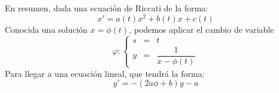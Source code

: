 En resumen, dada una ecuación de Riccati de la forma:
\begin{equation*}
    x' = a(t)x^2 + b(t)x + c(t)
\end{equation*}
Conocida una solución $x=\phi(t)$, podemos aplicar el cambio de variable
\begin{equation*}
    \varphi: \left\{\begin{array}{rcl}
            s &= &t \\
            y &= &\dfrac{1}{x-\phi(t)}
    \end{array}\right.
\end{equation*}
Para llegar a una ecuación lineal, que tendrá la forma:
\begin{equation*}
    y' = -(2a\phi + b)y-a
\end{equation*}

